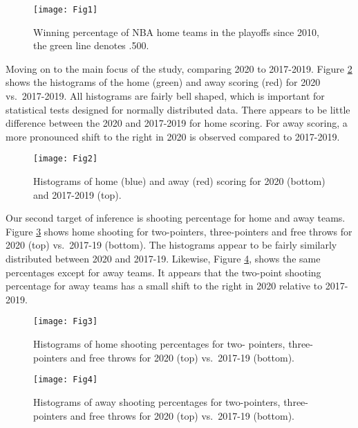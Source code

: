 \documentclass[10pt]{article}
\begin{document}
\begin{figure}[H]
  \centering
  \texttt{[image: Fig1]}
  \caption{Winning percentage of NBA home teams in the playoffs since
    2010, the green line denotes .500.}
  \label{fig:Fig1}
\end{figure}

Moving on to the main focus of the study, comparing 2020 to 2017-2019.
Figure \ref{fig:Fig2} shows the histograms of the home (green) and
away scoring (red) for 2020 vs.~2017-2019. All histograms are
fairly bell shaped, which is important for statistical tests
designed for normally distributed data. There appears to be little
difference between the 2020 and 2017-2019 for home scoring. For
away scoring, a more pronounced shift to the right in 2020 is observed
compared to 2017-2019.




\begin{figure}[H]
  \centering
  \texttt{[image: Fig2]}
  \caption{Histograms of home (blue) and away (red) scoring
    for 2020 (bottom) and 2017-2019 (top).}
  \label{fig:Fig2}
\end{figure}

Our second target of inference is shooting percentage for home and away teams.
Figure \ref{fig:Fig3} shows home shooting for two-pointers, three-pointers and
free throws for 2020 (top) vs.~2017-19 (bottom). The histograms appear to be fairly
similarly distributed between 2020 and 2017-19. Likewise, Figure \ref{fig:Fig4},
shows the same percentages except for away teams. It appears that the
two-point shooting percentage for away teams has a small shift to the
right in 2020 relative to 2017-2019.




\begin{figure}[H]
  \centering
  \texttt{[image: Fig3]}
  \caption{Histograms of home shooting percentages for two-
    pointers, three-pointers and free throws for 2020 (top) vs.~2017-19
    (bottom).}
  \label{fig:Fig3}
\end{figure}




\begin{figure}[H]
  \centering
  \texttt{[image: Fig4]}
  \caption{Histograms of away shooting percentages for two-pointers,
    three-pointers and free throws for 2020 (top) vs.~2017-19
    (bottom).}
  \label{fig:Fig4}  
\end{figure}
\end{document}
